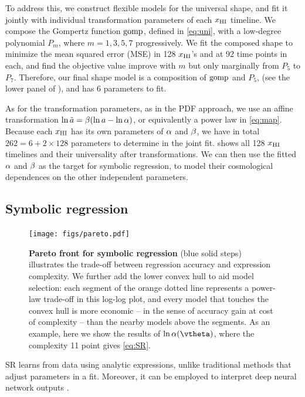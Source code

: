 To address this, we construct flexible models for the universal shape,
and fit it jointly with individual transformation parameters of each
$x_{\mathrm{HI}}$ timeline.
We compose the Gompertz function $\mathrm{gomp}$, defined in \cref{eq:uni}, with
a low-degree polynomial $P_m$, where $m = 1, 3, 5, 7$ progressively.
We fit the composed shape to minimize the mean squared error (MSE) in
128 $x_{\mathrm{HI}}$'s and at 92 time points in each, and find the objective
value improve with $m$ but only marginally from $P_5$ to $P_7$.
Therefore, our final shape model is a composition of $\mathrm{gomp}$ and $P_5$,
(see the lower panel of ), and has 6 parameters to fit.

As for the transformation parameters, as in the PDF approach, we use an
affine transformation $\ln\tilde{a} = \beta (\ln a - \ln\alpha)$, or equivalently
a power law in \cref{eq:map}.
Because each $x_{\mathrm{HI}}$ has its own parameters of $\alpha$ and $\beta$, we
have in total $262 = 6 + 2 \times 128$ parameters to determine in the
joint fit.
 shows all 128 $x_{\mathrm{HI}}$ timelines and their universality
after transformations.
We can then use the fitted $\alpha$ and $\beta$ as the target for symbolic
regression, to model their cosmological dependences on the other
independent parameters.


\subsection*{Symbolic regression}
\label{ssec:pysr}

\begin{figure}[tb]
\centering
\texttt{[image: figs/pareto.pdf]}
\caption{\textbf{Pareto front for symbolic regression} (blue solid
steps) illustrates the trade-off between regression accuracy and
expression complexity.
We further add the lower convex hull to aid model selection: each
segment of the orange dotted line represents a power-law trade-off in
this log-log plot, and every model that touches the convex hull is more
economic -- in the sense of accuracy gain at cost of complexity -- than
the nearby models above the segments.
As an example, here we show the results of $\ln\ap(\vtheta)$, where the
complexity 11 point gives \cref{eq:SR}.}
\label{fig:pareto}
\end{figure}

SR learns from data using analytic expressions, unlike traditional
methods that adjust parameters in a fit.
Moreover, it can be employed to interpret deep neural network outputs
\cite{Cranmer2020b}.

